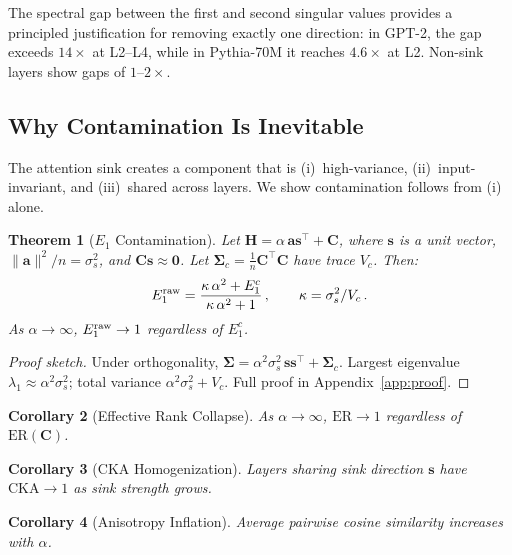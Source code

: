 \documentclass[11pt]{article}
\newtheorem{theorem}{Theorem}
\newtheorem{corollary}[theorem]{Corollary}
\begin{document}
The spectral gap between the first and second singular values provides a principled justification for removing exactly one direction: in GPT-2, the gap exceeds $14\times$ at L2--L4, while in Pythia-70M it reaches $4.6\times$ at L2.
Non-sink layers show gaps of $1$--$2\times$.

\subsection{Why Contamination Is Inevitable}\label{sec:theorem}

The attention sink creates a component that is (i)~high-variance, (ii)~input-invariant, and (iii)~shared across layers.
We show contamination follows from (i) alone.

\begin{theorem}[$E_1$ Contamination]\label{thm:e1}
Let $\mathbf{H} = \alpha\,\mathbf{a}\mathbf{s}^\top + \mathbf{C}$, where $\mathbf{s}$ is a unit vector, $\|\mathbf{a}\|^2/n = \sigma_s^2$, and $\mathbf{C}\mathbf{s} \approx \mathbf{0}$.
Let $\boldsymbol{\Sigma}_c = \frac{1}{n}\mathbf{C}^\top\mathbf{C}$ have trace $V_c$.
Then:
\begin{equation}\label{eq:e1}
    E_1^{\textup{raw}} = \frac{\kappa\,\alpha^2 + E_1^c}{\kappa\,\alpha^2 + 1}\,,
    \qquad \kappa = \sigma_s^2 / V_c\,.
\end{equation}
As $\alpha \to \infty$, $E_1^{\textup{raw}} \to 1$ regardless of $E_1^c$.
\end{theorem}

\begin{proof}[Proof sketch]
Under orthogonality, $\boldsymbol{\Sigma} = \alpha^2\sigma_s^2\,\mathbf{s}\mathbf{s}^\top + \boldsymbol{\Sigma}_c$.
Largest eigenvalue $\lambda_1 \approx \alpha^2\sigma_s^2$; total variance $\alpha^2\sigma_s^2 + V_c$.
Full proof in Appendix~\ref{app:proof}.
\end{proof}

\begin{corollary}[Effective Rank Collapse]
As $\alpha \to \infty$, $\mathrm{ER} \to 1$ regardless of $\mathrm{ER}(\mathbf{C})$.
\end{corollary}

\begin{corollary}[CKA Homogenization]
Layers sharing sink direction $\mathbf{s}$ have $\mathrm{CKA} \to 1$ as sink strength grows.
\end{corollary}

\begin{corollary}[Anisotropy Inflation]
Average pairwise cosine similarity increases with $\alpha$.
\end{corollary}
\end{document}
